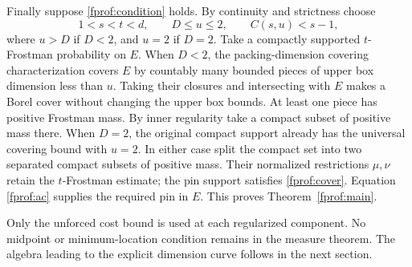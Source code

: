Finally suppose \eqref{fprof:condition} holds. By continuity and strictness choose
$$
 1<s<t<d,\qquad D\leq u\leq2,\qquad C(s,u)<s-1,
$$
where \(u>D\) if \(D<2\), and \(u=2\) if \(D=2\). Take a compactly supported \(t\)-Frostman probability on \(E\). When \(D<2\), the packing-dimension covering characterization covers \(E\) by countably many bounded pieces of upper box dimension less than \(u\). Taking their closures and intersecting with \(E\) makes a Borel cover without changing the upper box bounds. At least one piece has positive Frostman mass. By inner regularity take a compact subset of positive mass there. When \(D=2\), the original compact support already has the universal covering bound with \(u=2\). In either case split the compact set into two separated compact subsets of positive mass. Their normalized restrictions \(\mu,\nu\) retain the \(t\)-Frostman estimate; the pin support satisfies \eqref{fprof:cover}. Equation \eqref{fprof:ac} supplies the required pin in \(E\). This proves Theorem~\ref{fprof:main}.

Only the unforced cost bound is used at each regularized component.
No midpoint or minimum-location condition remains in the measure theorem.
The algebra leading to the explicit dimension curve follows in the next section.

